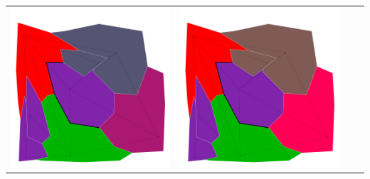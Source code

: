 \documentclass[10pt,a4paper]{article}
\begin{document}
\begin{tabular}{c c c c }
	
	\includegraphics[scale=.10]{../results/backtracking_forward/map_build/bt_forward_I00005.pdf}&
	\includegraphics[scale=.10]{../results/backtracking_forward/map_build/bt_forward_I00006.pdf}&

\end{tabular}
\end{document}
